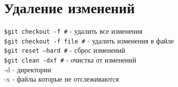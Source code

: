 \section{Удаление изменений}

\texttt{\$git checkout -f \indent \#} - удалить все изменения \\
\texttt{\$git checkout -f file \indent \#} - удалить изменения в файле \\
\texttt{\$git reset --hard \indent \#}  - сброс изменений \\
\texttt{\$git clean -dxf \indent \#} - очистка от изменений \\
\indent -d - директории \\
\indent -x - файлы которые не отслеживаются \\
